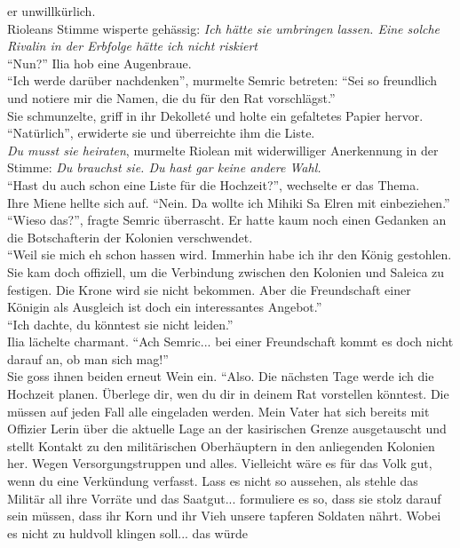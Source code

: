 er unwillkürlich.\\
Rioleans Stimme wisperte gehässig: \textit{Ich hätte sie umbringen lassen. Eine solche Rivalin in 
der Erbfolge hätte ich nicht riskiert}\\
``Nun?'' Ilia hob eine Augenbraue.\\
``Ich werde darüber nachdenken'', murmelte Semric betreten: ``Sei so freundlich und notiere mir die 
Namen, die du für den Rat vorschlägst.''\\
Sie schmunzelte, griff in ihr Dekolleté und holte ein gefaltetes Papier hervor. ``Natürlich'', 
erwiderte sie und überreichte ihm die Liste.\\
\textit{Du musst sie heiraten}, murmelte Riolean mit widerwilliger Anerkennung in der Stimme: 
\textit{Du brauchst sie. Du hast gar keine andere Wahl.}\\
``Hast du auch schon eine Liste für die Hochzeit?'', wechselte er das Thema.\\
Ihre Miene hellte sich auf. ``Nein. Da wollte ich Mihiki Sa Elren mit einbeziehen.''\\
``Wieso das?'', fragte Semric überrascht. Er hatte kaum noch einen Gedanken an die Botschafterin 
der Kolonien verschwendet.\\
``Weil sie mich eh schon hassen wird. Immerhin habe ich ihr den König gestohlen. Sie kam doch 
offiziell, um die Verbindung zwischen den Kolonien und Saleica zu festigen. Die Krone wird sie 
nicht bekommen. Aber die Freundschaft einer Königin als Ausgleich ist doch ein interessantes 
Angebot.''\\
``Ich dachte, du könntest sie nicht leiden.''\\
Ilia lächelte charmant. ``Ach Semric... bei einer Freundschaft kommt es doch nicht darauf an, ob 
man sich mag!''\\
Sie goss ihnen beiden erneut Wein ein. ``Also. Die nächsten Tage werde ich die Hochzeit 
planen. Überlege dir, wen du dir in deinem Rat vorstellen könntest. Die müssen auf jeden Fall alle 
eingeladen werden. Mein Vater hat sich bereits mit Offizier Lerin über die aktuelle Lage an der 
kasirischen Grenze ausgetauscht und stellt Kontakt zu den militärischen Oberhäuptern in den 
anliegenden Kolonien her. Wegen Versorgungstruppen und alles. Vielleicht wäre es für das Volk gut, 
wenn du eine Verkündung verfasst. Lass es nicht so aussehen, als stehle das Militär all ihre 
Vorräte und das Saatgut... formuliere es so, dass sie stolz darauf sein müssen, dass ihr Korn und 
ihr Vieh unsere tapferen Soldaten nährt. Wobei es nicht zu huldvoll klingen soll... das würde 
